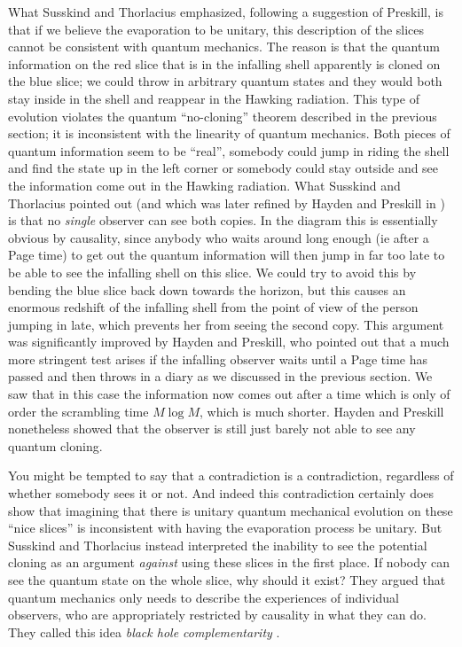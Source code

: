 \documentclass[12pt]{article}
\begin{document}
What Susskind and Thorlacius emphasized, following a suggestion of Preskill, is that if we believe the evaporation to be unitary, this description of the slices cannot be consistent with quantum mechanics.   The reason is that the quantum information on the red slice that is in the infalling shell apparently is cloned on the blue slice; we could throw in arbitrary quantum states and they would both stay inside in the shell and reappear in the Hawking radiation.  This type of evolution violates the quantum ``no-cloning'' theorem described in the previous section; it is inconsistent with the linearity of quantum mechanics.  Both pieces of quantum information seem to be ``real'', somebody could jump in riding the shell and find the state up in the left corner or somebody could stay outside and see the information come out in the Hawking radiation.  What Susskind and Thorlacius pointed out (and which was later refined by Hayden and Preskill in \cite{Hayden:2007cs}) is that no \textit{single} observer can see both copies.  In the diagram this is essentially obvious by causality, since anybody who waits around long enough (ie after a Page time) to get out the quantum information will then jump in far too late to be able to see the infalling shell on this slice.  We could try to avoid this by bending the blue slice back down towards the horizon, but this causes an enormous redshift of the infalling shell from the point of view of the person jumping in late, which prevents her from seeing the second copy.  This argument was significantly improved by Hayden and Preskill, who pointed out that a much more stringent test arises if the infalling observer waits until a Page time has passed and then throws in a diary as we discussed in the previous section.  We saw that in this case the information now comes out after a time which is only of order the scrambling time $M \log M$, which is much shorter.  Hayden and Preskill nonetheless showed that the observer is still just barely not able to see any quantum cloning.

You might be tempted to say that a contradiction is a contradiction, regardless of whether somebody sees it or not.  And indeed this contradiction certainly does show that imagining that there is unitary quantum mechanical evolution on these ``nice slices'' is inconsistent with having the evaporation process be unitary.  But Susskind and Thorlacius instead interpreted the inability to see the potential cloning as an argument \textit{against} using these slices in the first place.  If nobody can see the quantum state on the whole slice, why should it exist?  They argued that quantum mechanics only needs to describe the experiences of individual observers, who are appropriately restricted by causality in what they can do.  They called this idea \textit{black hole complementarity} \cite{Susskind:1993if,Susskind:1993mu,Lowe:1995ac,Kiem:1995iy}.  
\end{document}

